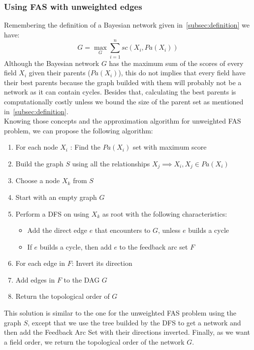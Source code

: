 \subsubsection{Using FAS with unweighted edges}
\label{subsub:fasunweighted}
	Remembering the definition of a Bayesian network given in~\ref{subsec:definition} we have:
		\[ G = \max_G \sum_{i=1}^n {sc}( X_i , {Pa}( X_i ) ) \]
	Although the Bayesian network $G$ has the maximum sum of the scores of every field $X_i$ given their parents (${Pa}( X_i )$), this do not implies that every field have their best parents because the graph builded with them will probably not be a network as it can contain cycles. Besides that, calculating the best parents is computationally costly unless we bound the size of the parent set as mentioned in~\ref{subsec:definition}.\\
	Knowing those concepts and the approximation algorithm for unweighted FAS problem, we can propose the following algorithm:
	\begin{enumerate}
		\item For each node $X_i$ : Find the ${Pa}( X_i )$ set with maximum score
		\item Build the graph $S$ using all the relationships $X_j \implies X_i, X_j \in {Pa}( X_i )$
		\item Choose a node $X_k$ from $S$
		\item Start with an empty graph $G$
		\item Perform a DFS on using $X_k$ as root with the following characteristics:
			\begin{itemize}
				\item Add the direct edge $e$ that encounters to $G$, unless $e$ builds a cycle
				\item If $e$ builds a cycle, then add $e$ to the feedback arc set $F$
			\end{itemize}
		\item For each edge in $F$: Invert its direction
		\item Add edges in $F$ to the DAG $G$
		\item Return the topological order of $G$
	\end{enumerate}
	This solution is similar to the one for the unweighted FAS problem using the graph $S$, except that we use the tree builded by the DFS to get a network and then add the Feedback Arc Set with their directions inverted. Finally, as we want a field order, we return the topological order of the network $G$.

